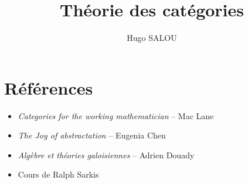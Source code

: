 \documentclass{../notes}
\title{Théorie des catégories}
\author{Hugo SALOU}
\begin{document}
  \maketitle

  \dominitoc
  \tableofcontents

  \pagebreak

  
  
  

  \chapter*{Références}

  \begin{itemize}
    \item \textit{Categories for the working mathematician} -- Mac Lane
    \item \textit{The Joy of abstractation} -- Eugenia Chen 
    \item \textit{Algèbre et théories galoisiennes} -- Adrien Douady
    \item Cours de Ralph Sarkis
  \end{itemize}
\end{document}
